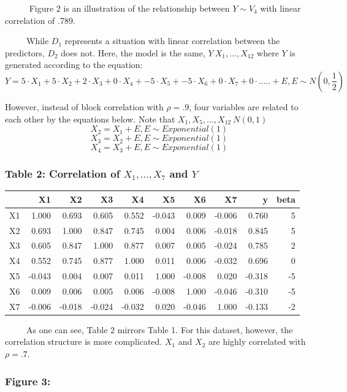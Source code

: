 \documentclass[12pt,twoside]{reedthesis}
\begin{document}
  ~~~~~ Figure 2 is an illustration of the relationship between
  \(Y\sim V_4\) with linear correlation of .789.
  
  ~~~~~While \(D_1\) represents a situation with linear correlation
  between the predictors, \(D_2\) does not. Here, the model is the same,
  \(Y~X_1,...,X_12\) where \(Y\) is generated according to the equation:
  \[Y = 5 \cdot X_1 + 5 \cdot X_2 + 2 \cdot X_3 + 0 \cdot X_4 + -5 \cdot X_5 + -5\cdot X_6 + 0\cdot X_7 + 0 \cdot ..... + E, E \sim N(0,\frac 1 2 )\]
  
  However, instead of block correlation with \(\rho = .9\), four variables
  are related to each other by the equations below. Note that
  \(X_1, X_5,...,X_{12} ~ N(0,1)\)
  \[X_2 = X_1 + E, E \sim Exponential(1)\]
  \[X_3 = X_2 + E, E \sim Exponential(1)\]
  \[X_4 = X_3 + E, E \sim Exponential(1)\]
  
  \subsubsection{\texorpdfstring{Table 2: Correlation of \(X_1,..., X_7\)
  and
  \(Y\)}{Table 2: Correlation of X\_1,..., X\_7 and Y}}\label{table-2-correlation-of-x_1...-x_7-and-y}
  
  \begin{longtable}[]{@{}lrrrrrrrrr@{}}
  \toprule
  & X1 & X2 & X3 & X4 & X5 & X6 & X7 & y & beta\tabularnewline
  \midrule
  \endhead
  X1 & 1.000 & 0.693 & 0.605 & 0.552 & -0.043 & 0.009 & -0.006 & 0.760 &
  5\tabularnewline
  X2 & 0.693 & 1.000 & 0.847 & 0.745 & 0.004 & 0.006 & -0.018 & 0.845 &
  5\tabularnewline
  X3 & 0.605 & 0.847 & 1.000 & 0.877 & 0.007 & 0.005 & -0.024 & 0.785 &
  2\tabularnewline
  X4 & 0.552 & 0.745 & 0.877 & 1.000 & 0.011 & 0.006 & -0.032 & 0.696 &
  0\tabularnewline
  X5 & -0.043 & 0.004 & 0.007 & 0.011 & 1.000 & -0.008 & 0.020 & -0.318 &
  -5\tabularnewline
  X6 & 0.009 & 0.006 & 0.005 & 0.006 & -0.008 & 1.000 & -0.046 & -0.310 &
  -5\tabularnewline
  X7 & -0.006 & -0.018 & -0.024 & -0.032 & 0.020 & -0.046 & 1.000 & -0.133
  & -2\tabularnewline
  \bottomrule
  \end{longtable}
  
  ~~~~~As one can see, Table 2 mirrors Table 1. For this dataset, however,
  the correlation structure is more complicated. \(X_1\) and \(X_2\) are
  highly correlated with \(\rho = .7\).
  
  \subsubsection{Figure 3:}\label{figure-3}
  
\end{document}
